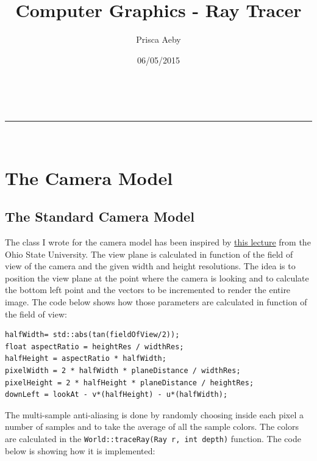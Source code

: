 \documentclass[a4paper,11.5pt]{article}
\makeatletter
\newcommand{\linia}{\rule{\linewidth}{0.5pt}}
\theoremstyle{mytheor}
\renewcommand{\maketitle}{
\begin{center}
\vspace{2ex}
{\huge \textsc{\@title}}
\vspace{1ex}
\\
\linia\\
\@author \hfill \@date
\vspace{4ex}
\end{center}
}
\makeatother
\begin{document}
\title{Computer Graphics - Ray Tracer}

\author{Prisca Aeby}

\date{06/05/2015}

\maketitle

\section{The Camera Model}
\subsection{The Standard Camera Model}
The class I wrote for the camera model has been inspired by \href{http://web.cse.ohio-state.edu/~parent/classes/681/Lectures/08.RTgeometryHO.pdf}{this lecture} from the Ohio State University. The view plane is calculated in function of the field of view of the camera and the given width and height resolutions. The idea is to position the view plane at the point where the camera is looking and to calculate the bottom left point and the vectors to be incremented to render the entire image. The code below shows how those parameters are calculated in function of the field of view:
\begin{lstlisting}
halfWidth= std::abs(tan(fieldOfView/2));
float aspectRatio = heightRes / widthRes;
halfHeight = aspectRatio * halfWidth;
pixelWidth = 2 * halfWidth * planeDistance / widthRes;
pixelHeight = 2 * halfHeight * planeDistance / heightRes;
downLeft = lookAt - v*(halfHeight) - u*(halfWidth);
\end{lstlisting}
The multi-sample anti-aliasing is done by randomly choosing inside each pixel a number of samples and to take the average of all the sample colors. The colors are calculated in the \texttt{World::traceRay(Ray r, int depth)} function. The code below is showing how it is implemented:
\end{document}
